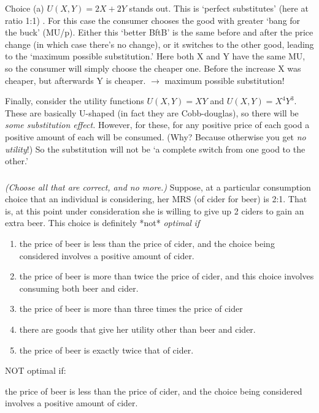 \documentclass[]{article}
\begin{document}
Choice (a) \(U(X,Y) =2X+2Y\) stands out. This is `perfect substitutes'
(here at ratio 1:1) . For this case the consumer chooses the good with
greater `bang for the buck' (MU/p). Either this `better BftB' is the
same before and after the price change (in which case there's no
change), or it switches to the other good, leading to the `maximum
possible substitution.' Here both X and Y have the same MU, so the
consumer will simply choose the cheaper one. Before the increase X was
cheaper, but afterwards Y is cheaper. \(\rightarrow\) maximum possible
substitution!

Finally, consider the utility functions \(U(X,Y) = XY\) and
\(U(X,Y)=X^4Y^3\). These are basically U-shaped (in fact they are
Cobb-douglas), so there will be \emph{some substitution effect.}
However, for these, for any positive price of each good a positive
amount of each will be consumed. (Why? Because otherwise you get
\emph{no utility}!) So the substitution will not be `a complete switch
from one good to the other.'

\hypertarget{section-9}{%
\subsubsection{}\label{section-9}}

\emph{(Choose all that are correct, and no more.)} Suppose, at a
particular consumption choice that an individual is considering, her MRS
(of cider for beer) is 2:1. That is, at this point under consideration
she is willing to give up 2 ciders to gain an extra beer. This choice is
definitely *not* \emph{optimal} \emph{if}

\begin{enumerate}
\def\labelenumi{\Alph{enumi}.}
\item
  the price of beer is less than the price of cider, and the choice
  being considered involves a positive amount of cider.
\item
  the price of beer is more than twice the price of cider, and this
  choice involves consuming both beer and cider.
\item
  the price of beer is more than three times the price of cider
\item
  there are goods that give her utility other than beer and cider.
\item
  the price of beer is exactly twice that of cider.
\end{enumerate}

NOT optimal if:

the price of beer is less than the price of cider, and the choice being
considered involves a positive amount of cider.
\end{document}
